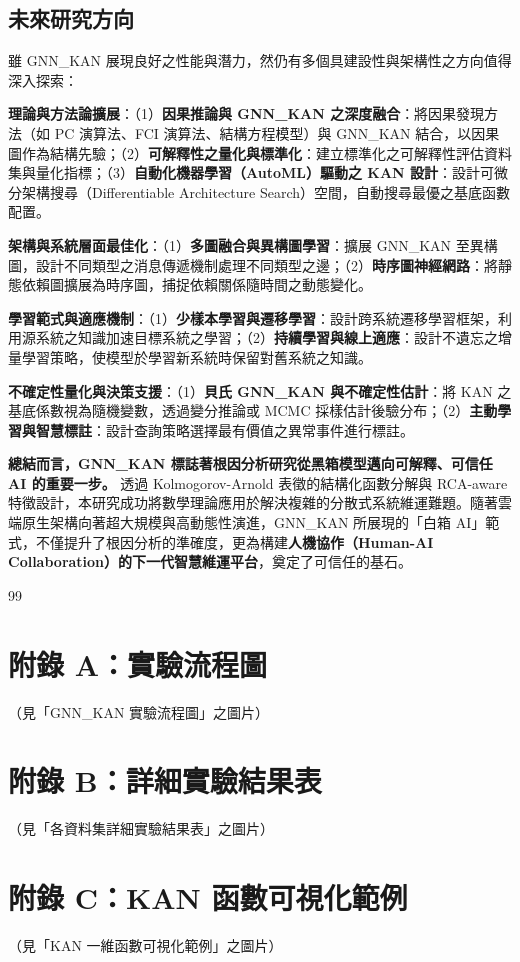 \documentclass[10pt,a4paper,twocolumn]{article}
\begin{document}
\subsection{未來研究方向}

雖 GNN\_KAN 展現良好之性能與潛力，然仍有多個具建設性與架構性之方向值得深入探索：

\textbf{理論與方法論擴展}：（1）\textbf{因果推論與 GNN\_KAN 之深度融合}：將因果發現方法（如 PC 演算法、FCI 演算法、結構方程模型）與 GNN\_KAN 結合，以因果圖作為結構先驗；（2）\textbf{可解釋性之量化與標準化}：建立標準化之可解釋性評估資料集與量化指標；（3）\textbf{自動化機器學習（AutoML）驅動之 KAN 設計}：設計可微分架構搜尋（Differentiable Architecture Search）空間，自動搜尋最優之基底函數配置。

\textbf{架構與系統層面最佳化}：（1）\textbf{多圖融合與異構圖學習}：擴展 GNN\_KAN 至異構圖，設計不同類型之消息傳遞機制處理不同類型之邊；（2）\textbf{時序圖神經網路}：將靜態依賴圖擴展為時序圖，捕捉依賴關係隨時間之動態變化。

\textbf{學習範式與適應機制}：（1）\textbf{少樣本學習與遷移學習}：設計跨系統遷移學習框架，利用源系統之知識加速目標系統之學習；（2）\textbf{持續學習與線上適應}：設計不遺忘之增量學習策略，使模型於學習新系統時保留對舊系統之知識。

\textbf{不確定性量化與決策支援}：（1）\textbf{貝氏 GNN\_KAN 與不確定性估計}：將 KAN 之基底係數視為隨機變數，透過變分推論或 MCMC 採樣估計後驗分布；（2）\textbf{主動學習與智慧標註}：設計查詢策略選擇最有價值之異常事件進行標註。

\textbf{總結而言，GNN\_KAN 標誌著根因分析研究從黑箱模型邁向可解釋、可信任 AI 的重要一步。} 透過 Kolmogorov-Arnold 表徵的結構化函數分解與 RCA-aware 特徵設計，本研究成功將數學理論應用於解決複雜的分散式系統維運難題。隨著雲端原生架構向著超大規模與高動態性演進，GNN\_KAN 所展現的「白箱 AI」範式，不僅提升了根因分析的準確度，更為構建\textbf{人機協作（Human-AI Collaboration）的下一代智慧維運平台}，奠定了可信任的基石。

\begin{thebibliography}{99}
\end{thebibliography}

\appendix

\section{附錄 A：實驗流程圖}

（見「GNN\_KAN 實驗流程圖」之圖片）

\section{附錄 B：詳細實驗結果表}

（見「各資料集詳細實驗結果表」之圖片）

\section{附錄 C：KAN 函數可視化範例}

（見「KAN 一維函數可視化範例」之圖片）
\end{document}
